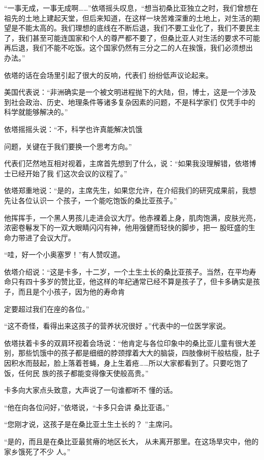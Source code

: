 \documentclass{article}
\begin{document}
“一事无成，一事无成啊……”依塔摇头叹息，“想当初桑比亚独立之时，我们曾想在祖先的土地上建起天堂，但后来知道，在这样一块苦难深重的土地上，对生活的期望是不能太高的。我们理想的底线在不断后退，我们不要工业化了，我们不要民主了，我们甚至可能连国家和个人的尊严都不要了，但桑比亚人对生活的要求不可能再后退，我们不能不吃饭。这个国家仍然有三分之二的人在挨饿，我们必须想出
办法。” 

依塔的话在会场里引起了很大的反响，代表们
纷纷低声议论起来。 

美国代表说：“非洲确实是一个被文明进程抛下的大陆，但，博士，这是一个涉及到社会政治、历史、地理条件等诸多复杂因素的问题，不是科学家们
仅凭手中的科学就能够解决的。” 

依塔摇摇头说：“不，科学也许真能解决饥饿

\newpage
问题，关键在于我们要换一个思考方向。” 

代表们茫然地互相对视着，主席首先想到了什么，说：“如果我没理解错，依塔博士已经开始了我
们这次会议的议程了。” 

依塔郑重地说：“是的，主席先生，如果您允许，在介绍我们的研究成果前，我想先让各位认识一
个孩子，一个能吃饱饭的桑比亚孩子。” 

他挥挥手，一个黑人男孩儿走进会议大厅。他赤裸着上身，肌肉饱满，皮肤光亮，浓密卷鬈发下的一双大眼睛闪闪有神，他用强健而轻快的脚步，把一
股旺盛的生命力带进了会议大厅。 


“哇，好一个小奥塞罗！”有人赞叹道。 

依塔介绍说：“这是卡多，十二岁，一个土生土长的桑比亚孩子。当然，在平均寿命只有四十多岁的赞比亚，他这样的年纪通常已经不算是孩子了，但卡多确实是孩子，而且是个小孩子，因为他的寿命肯

\newpage
定要超过我们在座的各位。” 

“这不奇怪，看得出来这孩子的营养状况很好
。”代表中的一位医学家说。 

依塔扶着卡多的双肩环视着会场说：“他肯定与各位印象中的桑比亚儿童有很大差别，那些饥饿中的孩子都是细细的脖颈撑着大大的脑袋，四肢像树干般枯瘦，肚子因积水而鼓起，脸上落着苍蝇，身上生着疮……所以大家都看到了。只要吃饱了饭，任何民
族的孩子都能变得像天使般高贵。” 

卡多向大家点头致意，大声说了一句谁都听不
懂的话。 

“他在向各位问好，”依塔说，“卡多只会讲
桑比亚语。” 

“您刚才说，这孩子是在桑比亚土生土长的？
”主席问。 

“是的，而且是在桑比亚最贫瘠的地区长大，
\newpage
从未离开那里。在这场旱灾中，他的家乡饿死了不少
人。” 
\end{document}
